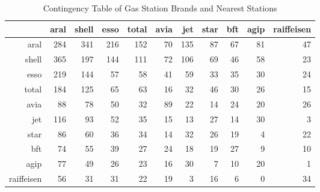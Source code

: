 \begin{table}[ht]
\centering
\begin{tabular}{rrrrrrrrrrr}
  \hline
 & aral & shell & esso & total & avia & jet & star & bft & agip & raiffeisen \\ 
  \hline
aral & 284 & 341 & 216 & 152 &  70 & 135 &  87 &  67 &  81 &  47 \\ 
  shell & 365 & 197 & 144 & 111 &  72 & 106 &  69 &  46 &  58 &  23 \\ 
  esso & 219 & 144 &  57 &  58 &  41 &  59 &  33 &  35 &  30 &  24 \\ 
  total & 184 & 125 &  65 &  63 &  16 &  32 &  46 &  30 &  26 &  15 \\ 
  avia &  88 &  78 &  50 &  32 &  89 &  22 &  14 &  24 &  20 &  26 \\ 
  jet & 116 &  93 &  52 &  35 &  15 &  13 &  27 &  14 &  30 &   3 \\ 
  star &  86 &  60 &  36 &  34 &  14 &  32 &  26 &  19 &   4 &  22 \\ 
  bft &  74 &  55 &  39 &  27 &  24 &  18 &  19 &  27 &   9 &  10 \\ 
  agip &  77 &  49 &  26 &  23 &  16 &  30 &   7 &  10 &  20 &   1 \\ 
  raiffeisen &  56 &  31 &  31 &  22 &  19 &   3 &  16 &   6 &   0 &  34 \\ 
   \hline
\end{tabular}
\caption{Contingency Table of Gas Station Brands and Nearest Stations} 
\end{table}
